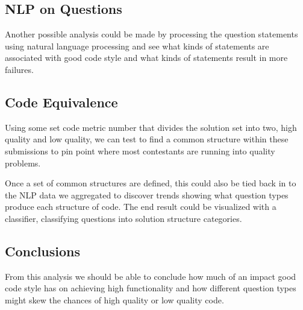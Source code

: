 \documentclass{article}
\begin{document}
\subsection{NLP on Questions}\label{nlp-on-questions}

Another possible analysis could be made by processing the question
statements using natural language processing and see what kinds of
statements are associated with good code style and what kinds of
statements result in more failures. \citet{kernalnlp}

\subsection{Code Equivalence}\label{code-equivalence}

Using some set code metric number that divides the solution set into
two, high quality and low quality, we can test to find a common
structure within these submissions to pin point where most contestants
are running into quality problems. \citet{kernalequival}

Once a set of common structures are defined, this could also be tied
back in to the NLP data we aggregated to discover trends showing what
question types produce each structure of code. The end result could be
visualized with a classifier, classifying questions into solution
structure categories.

\subsection{Conclusions}\label{conclusions}

From this analysis we should be able to conclude how much of an impact
good code style has on achieving high functionality and how different
question types might skew the chances of high quality or low quality
code.



\end{document}

